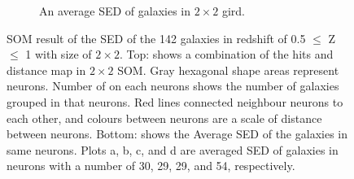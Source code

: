 \begin{figure}
\begin{subfigure}[b]{0.5\textwidth}
            \caption{An average SED of galaxies in  $2\times2$ gird.}
             \label{fig: sed_testmodel2by2}
        \end{subfigure}
        \caption{SOM result of the SED of the 142 galaxies in redshift of 0.5 $ \leq$ Z $\leq $ 1 with size of $2\times2$. Top: shows a combination of the hits and distance map in $2\times2$ SOM. Gray hexagonal shape areas represent neurons. Number of on each neurons shows the number of galaxies grouped in that neurons. Red lines connected neighbour neurons to each other, and colours between neurons are a scale of distance between neurons. Bottom: shows the Average SED of the galaxies in same neurons. Plots a, b, c, and d are averaged SED of galaxies in neurons with a number of 30, 29, 29, and 54, respectively.}
        \label{fig: testmodel1}
            
    \end{figure}
    
